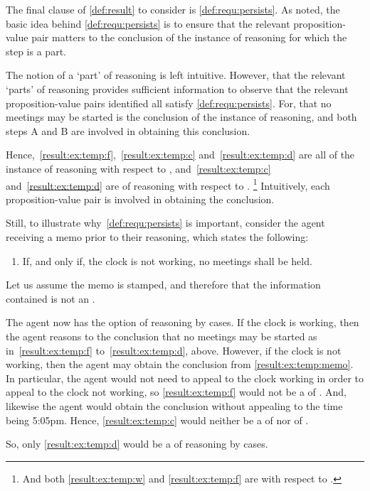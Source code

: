\begin{note}
  The final clause of \ref{def:result} to consider is \ref{def:requ:persists}.
  As noted, the basic idea behind \ref{def:requ:persists} is to ensure that the relevant proposition-value pair matters to the conclusion of the instance of reasoning for which the step is a part.

  The notion of a `part' of reasoning is left intuitive.
  However, that the relevant `parts' of reasoning provides sufficient information to observe that the relevant proposition-value pairs identified all satisfy \ref{def:requ:persists}.
  For, that no meetings may be started is the conclusion of the instance of reasoning, and both steps A and B are involved in obtaining this conclusion.

  Hence,~\ref{result:ex:temp:f},~\ref{result:ex:temp:c} and~\ref{result:ex:temp:d} are all  of the instance of reasoning with respect to \CStepB{}, and~\ref{result:ex:temp:c} and~\ref{result:ex:temp:d} are  of reasoning with respect to \CStepC{}.\nolinebreak
  \footnote{
    And both \ref{result:ex:temp:w} and \ref{result:ex:temp:f} are  with respect to \CStepA{}.
  }
  Intuitively, each proposition-value pair is involved in obtaining the conclusion.
\end{note}

\begin{note}
  Still, to illustrate why~\ref{def:requ:persists} is important, consider the agent receiving a memo prior to their reasoning, which states the following:
  \begin{enumerate}[label=\arabic*\('\), ref=(\arabic*\('\))]
  \item\label{result:ex:temp:memo} If, and only if, the clock is not working, no meetings shall be held.
  \end{enumerate}
  Let us assume the memo is stamped, and therefore that the information contained is not an \ep{}.

  The agent now has the option of reasoning by cases.
  If the clock is working, then the agent reasons to the conclusion that no meetings may be started as in~\ref{result:ex:temp:f} to~\ref{result:ex:temp:d}, above.
  However, if the clock is not working, then the agent may obtain the conclusion from \ref{result:ex:temp:memo}.
  In particular, the agent would not need to appeal to the clock working in order to appeal to the clock not working, so \ref{result:ex:temp:f} would not be a \result{} of \CStepB{}.
  And, likewise the agent would obtain the conclusion without appealing to the time being 5:05pm.
  Hence, \ref{result:ex:temp:c} would neither be a \result{} of \CStepB{} nor of \CStepC{}.

  So, only \ref{result:ex:temp:d} would be a \result{} of reasoning by cases.
\end{note}


